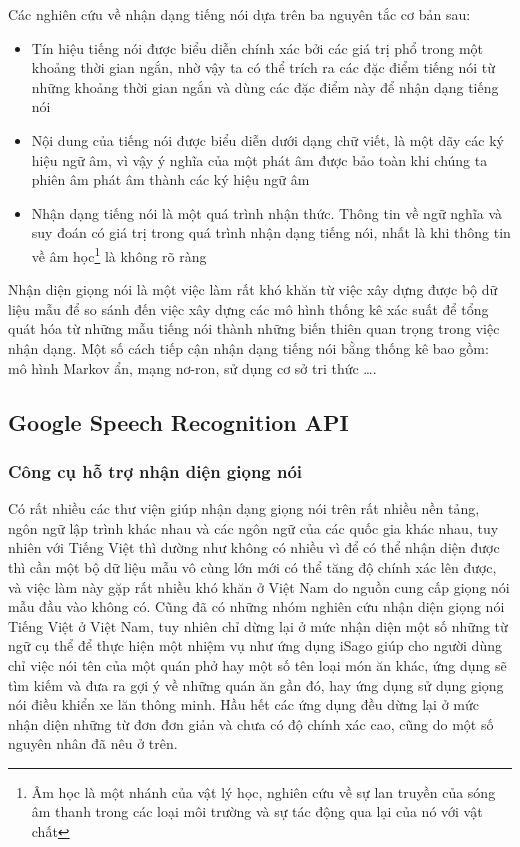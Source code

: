 \documentclass[12pt]{report}
\begin{document}
\noindent Các nghiên cứu về nhận dạng tiếng nói dựa trên ba nguyên tắc cơ bản sau:
\begin{itemize}
	\item Tín hiệu tiếng nói được biểu diễn chính xác bởi các giá trị phổ trong một khoảng thời gian ngắn, nhờ vậy ta có thể trích ra các đặc điểm tiếng nói từ những khoảng thời gian ngắn và dùng các đặc điểm này để nhận dạng tiếng nói
	\item Nội dung của tiếng nói được biểu diễn dưới dạng chữ viết, là một dãy các ký hiệu ngữ âm, vì vậy ý nghĩa của một phát âm được bảo toàn khi chúng ta phiên âm phát âm thành các ký hiệu ngữ âm
	\item Nhận dạng tiếng nói là một quá trình nhận thức. Thông tin về ngữ nghĩa và suy đoán có giá trị trong quá trình nhận dạng tiếng nói, nhất là khi thông tin về âm học{\footnote{Âm học là một nhánh của vật lý học, nghiên cứu về sự lan truyền của sóng âm thanh trong các loại môi trường và sự tác động qua lại của nó với vật chất}} là không rõ ràng
\end{itemize}

Nhận diện giọng nói là một việc làm rất khó khăn từ việc xây dựng được bộ dữ liệu mẫu để so sánh đến việc xây dựng các mô hình thống kê xác suất để tổng quát hóa từ những mẫu tiếng nói thành những biến thiên quan trọng trong việc nhận dạng. Một số cách tiếp cận nhận dạng tiếng nói bằng thống kê bao gồm: mô hình Markov ẩn, mạng nơ-ron, sử dụng cơ sở tri thức \ldots.

\subsection{Google Speech Recognition API}
\subsubsection{Công cụ hỗ trợ nhận diện giọng nói}
Có rất nhiều các thư viện giúp nhận dạng giọng nói trên rất nhiều nền tảng, ngôn ngữ lập trình khác nhau và các ngôn ngữ của các quốc gia khác nhau, tuy nhiên với Tiếng Việt thì dường như không có nhiều vì để có thể nhận diện được thì cần một bộ dữ liệu mẫu vô cùng lớn mới có thể tăng độ chính xác lên được, và việc làm này gặp rất nhiều khó khăn ở Việt Nam do nguồn cung cấp giọng nói mẫu đầu vào không có. Cũng đã có những nhóm nghiên cứu nhận diện giọng nói Tiếng Việt ở Việt Nam, tuy nhiên chỉ dừng lại ở mức nhận diện một số những từ ngữ cụ thể để thực hiện một nhiệm vụ như ứng dụng iSago giúp cho người dùng chỉ việc nói tên của một quán phở hay một số tên loại món ăn khác, ứng dụng sẽ tìm kiếm và đưa ra gợi ý về những quán ăn gần đó, hay ứng dụng sử dụng giọng nói điều khiển xe lăn thông minh. Hầu hết các ứng dụng đều dừng lại ở mức nhận diện những từ đơn đơn giản và chưa có độ chính xác cao, cũng do một số nguyên nhân đã nêu ở trên.
\end{document}
